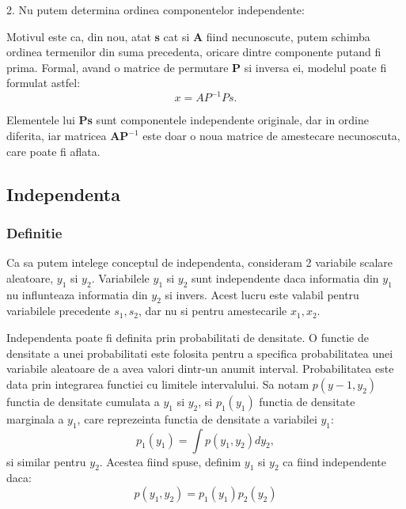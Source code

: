 \documentclass[12pt]{article}
\begin{document}
2. Nu putem determina ordinea componentelor independente:

Motivul este ca, din nou, atat \textbf{s} cat si \textbf{A} fiind necunoscute, putem schimba ordinea termenilor din suma precedenta, oricare dintre componente putand fi prima. Formal, avand o matrice de permutare \textbf{P} si inversa ei, modelul poate fi formulat astfel:
\begin{equation}
	x=AP^{-1}Ps.
\end{equation}

Elementele lui \textbf{Ps} sunt componentele independente originale, dar in ordine diferita, iar matricea $\textbf{AP}^{-1}$ este doar o noua matrice de amestecare necunoscuta, care poate fi aflata.
\newpage

\subsection{Independenta}
\subsubsection{Definitie} 

Ca sa putem intelege conceptul de independenta, consideram 2 variabile scalare aleatoare, $y_1$ si $y_2$. Variabilele $y_1$ si $y_2$ sunt independente daca informatia din $y_1$ nu influnteaza informatia din $y_2$ si invers. Acest lucru este valabil pentru variabilele precedente $s_1,s_2$, dar nu si pentru amestecarile $x_1,x_2$.

Independenta poate fi definita prin probabilitati de densitate. O functie de densitate a unei probabilitati este folosita pentru a specifica probabilitatea unei variabile aleatoare de a avea valori dintr-un anumit interval. Probabilitatea este data prin integrarea functiei cu limitele intervalului. Sa notam $p(y-1,y_2)$ functia de densitate cumulata a $y_1$ si $y_2$, si $p_1(y_1)$ functia de densitate marginala a $y_1$, care reprezeinta functia de densitate a variabilei $y_1$:
\begin{equation}
p_1(y_1)=\int{p(y_1,y_2)dy_2},
\end{equation}
si similar pentru $y_2$. Acestea fiind spuse, definim $y_1$ si $y_2$ ca fiind independente daca:
\begin{equation}
	p(y_1,y_2)=p_1(y_1)p_2(y_2)
\end{equation}
\end{document}
